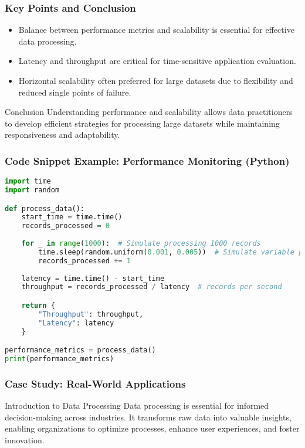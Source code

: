 \documentclass[aspectratio=169]{beamer}
\begin{document}
\begin{frame}[fragile]
    \frametitle{Key Points and Conclusion}
    \begin{itemize}
        \item Balance between performance metrics and scalability is essential for effective data processing.
        \item Latency and throughput are critical for time-sensitive application evaluation.
        \item Horizontal scalability often preferred for large datasets due to flexibility and reduced single points of failure.
    \end{itemize}
    \begin{block}{Conclusion}
        Understanding performance and scalability allows data practitioners to develop efficient strategies for processing large datasets while maintaining responsiveness and adaptability.
    \end{block}
\end{frame}

\begin{frame}[fragile]
    \frametitle{Code Snippet Example: Performance Monitoring (Python)}
    \begin{lstlisting}[language=Python]
import time
import random

def process_data():
    start_time = time.time()
    records_processed = 0
    
    for _ in range(1000):  # Simulate processing 1000 records
        time.sleep(random.uniform(0.001, 0.005))  # Simulate variable processing time
        records_processed += 1
    
    latency = time.time() - start_time
    throughput = records_processed / latency  # records per second

    return {
        "Throughput": throughput,
        "Latency": latency
    }

performance_metrics = process_data()
print(performance_metrics)
    \end{lstlisting}
\end{frame}

\begin{frame}[fragile]
    \frametitle{Case Study: Real-World Applications}
    \begin{block}{Introduction to Data Processing}
        Data processing is essential for informed decision-making across industries. It transforms raw data into valuable insights, enabling organizations to optimize processes, enhance user experiences, and foster innovation.
    \end{block}
\end{frame}
\end{document}
